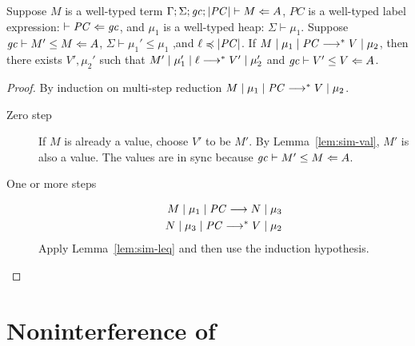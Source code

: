 \begin{lemma}
\label{lem:sim-mult}
Suppose $M$ is a well-typed \CC term $\Gamma ; \Sigma ; \mathit{gc} ; |\mathit{PC}| \vdash M \Leftarrow A$,
$PC$ is a well-typed label expression: $\vdash \mathit{PC} \Leftarrow \mathit{gc}$, and $\mu_1$ is a well-typed
heap: $\Sigma \vdash \mu_1$.
Suppose ${\mathit{gc}}\vdash{M'}\leq{M}\Leftarrow{A}$, $\Sigma \vdash \mu_1' \leq \mu_1$ ,and $\ell \preccurlyeq |\mathit{PC}|$.
If ${M}\mid{\mu_1}\mid{\ensuremath{\mathit{PC}}}\longrightarrow^{*}{V}\mid{\mu_2}$, then there exists $V',\mu_2'$ such that
${M'}\mid{\mu_1'}\mid{\ell}\longrightarrow^{*}{V'}\mid{\mu_2'}$
and ${\mathit{gc}}\vdash{V'}\leq{V}\Leftarrow{A}$.
\end{lemma}
\begin{proof}
By induction on multi-step reduction ${M}\mid{\mu_1}\mid{\ensuremath{\mathit{PC}}}\longrightarrow^{*}{V}\mid{\mu_2}$.
\begin{description}
\item[Zero step] If $M$ is already a value, choose $V'$ to be $M'$.
By Lemma~\ref{lem:sim-val}, $M'$ is also a value.
The values are in sync because ${\mathit{gc}}\vdash{M'}\leq{M}\Leftarrow{A}$.
\item[One or more steps]
\begin{align}
{M}\mid{\mu_1}\mid{\ensuremath{\mathit{PC}}}\longrightarrow{N}\mid{\mu_3} \\
{N}\mid{\mu_3}\mid{\ensuremath{\mathit{PC}}}\longrightarrow^{*}{V}\mid{\mu_2}
\end{align}
Apply Lemma~\ref{lem:sim-leq} and then use the induction hypothesis.
\end{description}
\end{proof}

\section{Noninterference of \Surface}
\label{sec:NI}


